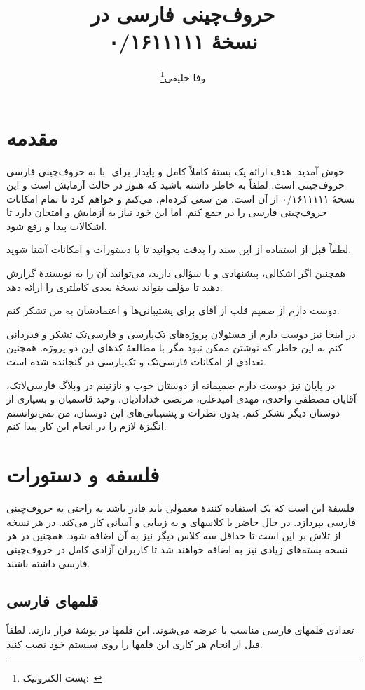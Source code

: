 \documentclass[a4paper,11pt]{refrep}
\title{حروف‌چینی فارسی در \LR{\XePersian}\\[0.2cm]نسخهٔ ۰/۱۶۱۱۱۱۱}
\author{وفا خلیقی\thanks{پست الکترونیک:~\LR{vafa.khalighi@students.mq.edu.au}}}
\begin{document}
\maketitle
\tableofcontents
\chapter{مقدمه}
به حروف‌چینی فارسی ‪ ‬با ‪\LR{\XePersian} ‬خوش آمدید. هدف \LR{\XePersian} ارائه یک بستهٔ کاملاً کامل و پایدار برای حروف‌چینی است. لطفاً به خاطر داشته باشید که \LR{\XePersian} هنوز در حالت آزمایش است و این نسخهٔ ۰/۱۶۱۱۱۱۱ از آن است. من سعی کرده‌ام، می‌کنم و خواهم کرد تا تمام امکانات حروف‌چینی فارسی را در \LR{\XePersian} جمع کنم. اما این خود نیاز به آزمایش و امتحان دارد تا اشکالات پیدا و رفع شود.


لطفاً قبل از استفاده از \LR{\XePersian} این سند را بدقت بخوانید تا با دستورات و امکانات \LR{\XePersian} آشنا شوید.

همچنین اگر اشکالی، پیشنهادی و یا سؤالی دارید، می‌توانید آن را به نویسندهٔ \LR{\XePersian} گزارش دهید تا مؤلف \LR{\XePersian} بتواند نسخهٔ بعدی کاملتری را ارائه دهد.

دوست دارم از صمیم قلب از آقای  برای پشتیبانی‌ها و اعتمادشان به من تشکر کنم.

در اینجا نیز دوست دارم از مسئولان پروژه‌های تک‌پارسی و فارسی‌تک تشکر و قدردانی کنم به این خاطر که نوشتن \LR{\XePersian} ممکن نبود مگر با مطالعهٔ کدهای این دو پروژه. همچنین تعدادی از امکانات فارسی‌تک و  تک‌پارسی در \LR{\XePersian} گنجانده شده است.

در پایان نیز دوست دارم صمیمانه از دوستان خوب و نازنینم در وبلاگ فارسی‌لاتک، آقایان مصطفی واحدی، مهدی امیدعلی، مرتضی خدادادیان، وحید قاسمیان و بسیاری از دوستان دیگر تشکر کنم. بدون نظرات و پشتیبانی‌های این دوستان، من نمی‌توانستم انگیزهٔ لازم را در انجام این کار پیدا کنم.
\chapter{فلسفه و دستورات}
فلسفهٔ \LR{\XePersian} این است که یک استفاده کنندهٔ معمولی باید قادر باشد به راحتی به حروف‌چینی فارسی بپردازد. در حال حاضر \LR{\XePersian} با کلاسهای  و  به زیبایی و آسانی کار می‌کند. در هر نسخه از \LR{\XePersian} تلاش بر این است تا حداقل سه کلاس دیگر نیز به آن اضافه شود. همچنین در هر نسخه بسته‌های زیادی نیز به \LR{\XePersian} اضافه خواهند شد تا کاربران آزادی کامل در حروف‌چینی فارسی داشته باشند.

\section{قلمهای فارسی}
تعدادی قلمهای فارسی مناسب با \LR{\XePersian} عرضه می‌شوند. این قلمها در پوشهٔ  قرار دارند. لطفاً قبل از انجام هر کاری این قلمها را روی سیستم خود نصب کنید.
\end{document}

